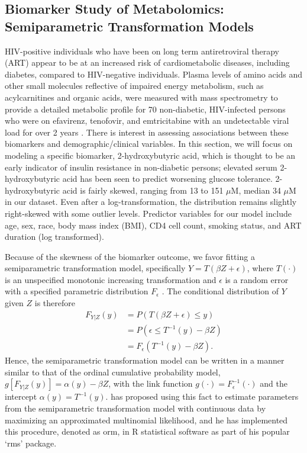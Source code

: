 \documentclass[12pt, usenatbib]{article}
\begin{document}
\subsection{Biomarker Study of Metabolomics: Semiparametric Transformation Models}

HIV-positive individuals who have been on long term antiretroviral therapy (ART) appear to be at an increased risk of cardiometabolic diseases, including diabetes, compared to HIV-negative individuals.  Plasma levels of amino acids and other small molecules reflective of impaired energy metabolism, such as acylcarnitines and organic acids, were measured with mass spectrometry to provide a detailed metabolic profile for 70 non-diabetic, HIV-infected persons who were on efavirenz, tenofovir, and emtricitabine with an undetectable viral load for over 2 years \citep{koethe2016}.  There is interest in assessing associations between these biomarkers and demographic/clinical variables.  In this section, we will focus on modeling a specific biomarker, 2-hydroxybutyric acid, which is thought to be an early indicator of insulin resistance in non-diabetic persons; elevated serum 2-hydroxybutyric acid has been seen to predict worsening glucose tolerance.  2-hydroxybutyric acid is fairly skewed, ranging from 13 to 151 $\mu$M, median 34 $\mu$M in our dataset.  Even after a log-transformation, the distribution remains slightly right-skewed with some outlier levels.  Predictor variables for our model include age, sex, race, body mass index (BMI), CD4 cell count, smoking status, and ART duration (log transformed).

Because of the skewness of the biomarker outcome, we favor fitting a semiparametric transformation model, specifically $Y=T(\beta Z + \epsilon)$, where $T(\cdot)$ is an unspecified monotonic increasing transformation and $\epsilon$ is a random error with a specified parametric distribution $F_{\epsilon}$ \citep{zeng2007}.  The conditional distribution of $Y$ given $Z$ is therefore 
\begin{align*}
F_{Y|Z}(y)&=P(T(\beta Z + \epsilon) \leq y) \\
&= P( \epsilon \leq T^{-1}(y) - \beta Z)  \\
&=F_{\epsilon}(T^{-1}(y) - \beta Z).
\end{align*}  
Hence, the semiparametric transformation model can be written in a manner similar to that of the ordinal cumulative probability model, $g[F_{Y|Z}(y)]=\alpha(y)-\beta Z$, with the link function $g(\cdot)=F^{-1}_{\epsilon}(\cdot)$ and the intercept $\alpha(y)=T^{-1}(y)$.  \cite{harrell2015} has proposed using this fact to estimate parameters from the semiparametric transformation model with continuous data by maximizing an approximated multinomial likelihood, and he has implemented this procedure, denoted as orm, in R statistical software as part of his popular \lq rms' package. 
\end{document}
